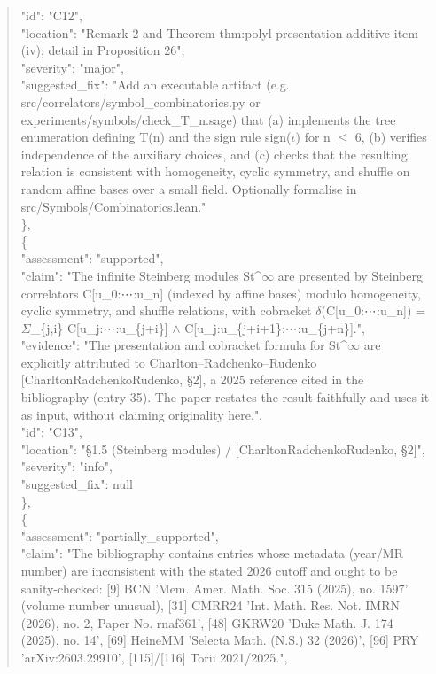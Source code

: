 \documentclass[11pt]{article}
\begin{document}
\begin{quote}
      "id": "C12",\\
      "location": "Remark 2 and Theorem thm:polyl-presentation-additive item (iv); detail in Proposition 26",\\
      "severity": "major",\\
      "suggested\_fix": "Add an executable artifact (e.g. src/correlators/symbol\_combinatorics.py or experiments/symbols/check\_T\_n.sage) that (a) implements the tree enumeration defining T(n) and the sign rule sign(\ensuremath{\iota}) for n \ensuremath{\le} 6, (b) verifies independence of the auxiliary choices, and (c) checks that the resulting relation is consistent with homogeneity, cyclic symmetry, and shuffle on random affine bases over a small field. Optionally formalise in src/Symbols/Combinatorics.lean."\\
    \},\\
    \{\\
      "assessment": "supported",\\
      "claim": "The infinite Steinberg modules St\^{}\ensuremath{\infty} are presented by Steinberg correlators C[u\_0:⋯:u\_n] (indexed by affine bases) modulo homogeneity, cyclic symmetry, and shuffle relations, with cobracket \ensuremath{\delta}(C[u\_0:⋯:u\_n]) = \ensuremath{\Sigma}\_\{j,i\} C[u\_j:⋯:u\_\{j+i\}] \ensuremath{\wedge} C[u\_j:u\_\{j+i+1\}:⋯:u\_\{j+n\}].",\\
      "evidence": "The presentation and cobracket formula for St\^{}\ensuremath{\infty} are explicitly attributed to Charlton--Radchenko--Rudenko [CharltonRadchenkoRudenko, §2], a 2025 reference cited in the bibliography (entry 35). The paper restates the result faithfully and uses it as input, without claiming originality here.",\\
      "id": "C13",\\
      "location": "§1.5 (Steinberg modules) / [CharltonRadchenkoRudenko, §2]",\\
      "severity": "info",\\
      "suggested\_fix": null\\
    \},\\
    \{\\
      "assessment": "partially\_supported",\\
      "claim": "The bibliography contains entries whose metadata (year/MR number) are inconsistent with the stated 2026 cutoff and ought to be sanity-checked: [9] BCN 'Mem. Amer. Math. Soc. 315 (2025), no. 1597' (volume number unusual), [31] CMRR24 'Int. Math. Res. Not. IMRN (2026), no. 2, Paper No. rnaf361', [48] GKRW20 'Duke Math. J. 174 (2025), no. 14', [69] HeineMM 'Selecta Math. (N.S.) 32 (2026)', [96] PRY 'arXiv:2603.29910', [115]/[116] Torii 2021/2025.",\\

\end{quote}
\end{document}
